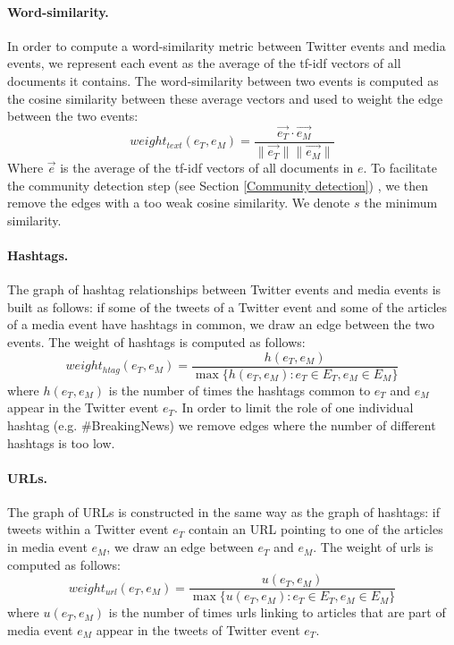 \paragraph{Word-similarity.}
In order to compute a word-similarity metric between Twitter events and media events, we represent each event as the average of the tf-idf vectors of all documents it contains. The word-similarity between two events is computed as the cosine similarity between these average vectors and used to weight the edge between the two events:
	\begin{equation}
    weight_{text}(e_T, e_M) = \frac{\vec{e_T} \cdot \vec{e_M}}{\| \vec{e_T}\|\| \vec{e_M}\|}
	\end{equation}
Where $\vec{e}$ is the average of the tf-idf vectors of all documents in $e$. To facilitate the community detection step (see Section \ref{Community detection}) , we then remove the edges with a too weak cosine similarity. We denote $s$ the minimum similarity.

\paragraph{Hashtags.} The graph of hashtag relationships between Twitter events and media events is built as follows: if some of the tweets of a Twitter event and some of the articles of a media event have hashtags in common, we draw an edge between the two events. The weight of hashtags is computed as follows:
\begin{equation}
    weight_{htag}(e_T, e_M) = \frac{h(e_T, e_M)}{\max \{h(e_T, e_M): e_T \in E_T,e_M \in E_M \}}
\end{equation}
where $h(e_T, e_M)$ is the number of times the hashtags common to $e_T$ and $e_M$ appear in the Twitter event $e_T$. In order to limit the role of one individual hashtag (e.g. \#BreakingNews) we remove edges where the number of different hashtags is too low.

\paragraph{URLs.} The graph of URLs is constructed in the same way as the graph of hashtags: if tweets within a Twitter event $e_T$ contain an URL pointing to one of the articles in media event $e_M$, we draw an edge between $e_T$ and $e_M$. The weight of urls is computed as follows:
\begin{equation}
    weight_{url}(e_T, e_M) = \frac{u(e_T, e_M)}{\max \{u(e_T, e_M): e_T \in E_T,e_M \in E_M \}}
\end{equation}
where $u(e_T, e_M)$ is the number of times urls linking to articles that are part of media event $e_M$ appear in the tweets of Twitter event $e_T$.

